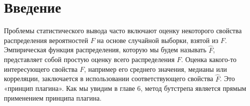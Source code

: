 \section{Введение}

Проблемы статистического вывода часто включают оценку некоторого свойства распределения вероятностей $F$ на основе случайной выборки, взятой из $F$. Эмпирическая функция распределения, которую мы будем называть $\hat F$, представляет собой простую оценку всего распределения $F$. Оценка какого-то интересующего свойства $F$, например его среднего значения, медианы или корреляции, заключается в использовании соответствующего свойства $\hat F$. Это «принцип плагина». Как мы увидим в главе 6, метод бутстрепа является прямым применением принципа плагина. 